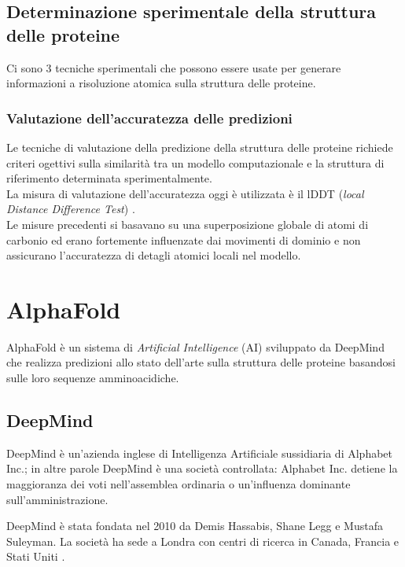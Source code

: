 \section{Determinazione sperimentale della struttura delle proteine}

Ci sono 3 tecniche sperimentali che possono essere usate per generare informazioni a risoluzione atomica sulla struttura delle proteine.

\subsection{Valutazione dell'accuratezza delle predizioni}

Le tecniche di valutazione della predizione della struttura delle proteine richiede criteri ogettivi sulla similarità tra un modello computazionale e la struttura di riferimento determinata sperimentalmente.\\

La misura di valutazione dell'accuratezza oggi è utilizzata è il lDDT (\textit{local Distance
	Difference Test}) \cite{mariani2013lddt}. \\

Le misure precedenti si basavano su una superposizione globale di atomi di carbonio ed erano fortemente influenzate dai movimenti di dominio e non assicurano l'accuratezza di detagli atomici locali nel modello.



\chapter{AlphaFold}
AlphaFold è un sistema di \textit{Artificial Intelligence }(AI) sviluppato da DeepMind che realizza predizioni allo stato dell'arte sulla struttura delle proteine basandosi sulle loro sequenze amminoacidiche.

\section{DeepMind}

DeepMind è un'azienda inglese di Intelligenza Artificiale sussidiaria di Alphabet Inc.; in altre parole DeepMind è una società controllata: Alphabet Inc. detiene la maggioranza dei voti nell'assemblea ordinaria o un'influenza dominante sull'amministrazione.

\par DeepMind è stata fondata nel 2010 da Demis Hassabis, Shane Legg e Mustafa Suleyman. La società ha sede a Londra con centri di ricerca in Canada, Francia e Stati Uniti \cite{deepMindWiki}.

